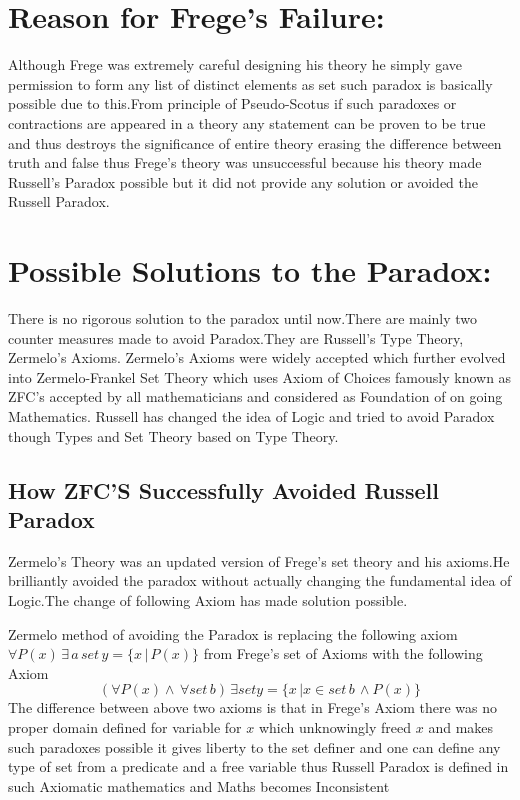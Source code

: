 \documentclass[a4paper]{article}
\begin{document}
\section{Reason for Frege's Failure:}
Although Frege was extremely careful designing his theory he simply
gave permission to form any list of distinct elements as set such 
paradox is basically possible due to this.From principle of
Pseudo-Scotus if such paradoxes or contractions are appeared in 
a theory any statement can be proven to be true and thus destroys 
the significance of entire theory erasing the difference between 
truth and false thus Frege's theory was unsuccessful because his 
theory made Russell's Paradox possible but it did not provide any
solution or avoided the Russell Paradox. 

\newpage
\section{Possible Solutions to the Paradox:}
There is no rigorous solution to the paradox until now.There are
mainly two counter measures made to avoid Paradox.They are
Russell's Type Theory, Zermelo's Axioms. Zermelo's Axioms were
widely accepted which further evolved into Zermelo-Frankel
Set Theory which uses Axiom of Choices famously known as ZFC's 
accepted by all mathematicians and considered as Foundation of
on going Mathematics. Russell has changed the idea of Logic and
tried to avoid Paradox though Types and Set Theory based on Type
Theory.
\subsection{How ZFC'S Successfully Avoided Russell Paradox}
Zermelo's Theory was an updated version of Frege's set theory and
his axioms.He brilliantly avoided the paradox without actually changing
the fundamental idea of Logic.The change of following Axiom has made
solution possible.
\par \null \par
\noindent Zermelo method of avoiding the Paradox is replacing the 
 following axiom \\
$\forall P(x) \, \exists \, a\,set\,y=\{x\,|\,P(x)\}$ from Frege's
set of Axioms with the following Axiom 
$$(\forall P(x) \land \, \forall set\,b)\, \exists set 
y=\{x\,|x\in set\,b \,\land P(x)\} $$
The difference between above two axioms is that in Frege's Axiom
there was no proper domain defined for variable for $x$ which
unknowingly freed $x$ and makes such paradoxes possible it gives 
liberty to the set definer and one can define any type of set 
from a predicate and a free variable thus Russell Paradox is defined
in such Axiomatic mathematics and Maths becomes Inconsistent
\end{document}
